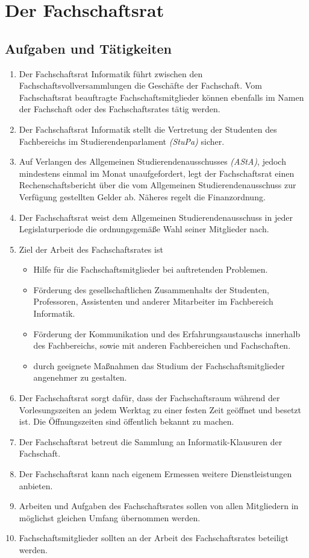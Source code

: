 \section{Der Fachschaftsrat}

\subsection{Aufgaben und Tätigkeiten}
\begin{enumerate}
	\item Der Fachschaftsrat Informatik führt zwischen den Fachschaftsvollversammlungen die Geschäfte der Fachschaft. Vom Fachschaftsrat beauftragte Fachschaftsmitglieder können ebenfalls im Namen der Fachschaft oder des Fachschaftsrates tätig werden.
	\item Der Fachschaftsrat Informatik stellt die Vertretung der Studenten des Fachbereichs im Studierendenparlament \textit{(StuPa)} sicher.
	\item Auf Verlangen des Allgemeinen Studierendenausschusses \textit{(AStA)}, jedoch mindestens einmal im Monat unaufgefordert, legt der Fachschaftsrat einen Rechenschaftsbericht über die vom Allgemeinen Studierendenausschuss zur Verfügung gestellten Gelder ab. Näheres regelt die Finanzordnung.
	\item Der Fachschaftsrat weist dem Allgemeinen Studierendenausschuss in jeder Legislaturperiode die ordnungsgemäße Wahl seiner Mitglieder nach.
	\item Ziel der Arbeit des Fachschaftsrates ist
	\begin{itemize}
		\item Hilfe für die Fachschaftsmitglieder bei auftretenden Problemen.
		\item Förderung des gesellschaftlichen Zusammenhalts der Studenten, Professoren, Assistenten und anderer Mitarbeiter im Fachbereich Informatik.
		\item Förderung der Kommunikation und des Erfahrungsaustauschs innerhalb des Fachbereichs, sowie mit anderen Fachbereichen und Fachschaften.
		\item durch geeignete Maßnahmen das Studium der Fachschaftsmitglieder angenehmer zu gestalten.
	\end{itemize}
	\item Der Fachschaftsrat sorgt dafür, dass der Fachschaftsraum während der Vorlesungszeiten an jedem Werktag zu einer festen Zeit geöffnet und besetzt ist. Die Öffnungszeiten sind öffentlich bekannt zu machen.
	\item Der Fachschaftsrat betreut die Sammlung an Informatik-Klausuren der Fachschaft.
	\item Der Fachschaftsrat kann nach eigenem Ermessen weitere Dienstleistungen anbieten.
	\item Arbeiten und Aufgaben des Fachschaftsrates sollen von allen Mitgliedern in möglichst gleichen Umfang übernommen werden.
	\item Fachschaftsmitglieder sollten an der Arbeit des Fachschaftsrates beteiligt werden.
\end{enumerate}

